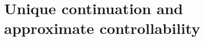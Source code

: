\documentclass[11pt]{article}
\numberwithin{equation}{section}
\def\pt{\partial}
\def\vp{\varphi}
\def\bf{\textbf}
\def\pt{\partial}
\def\om{\omega}
\def\Om{\Omega}
\def\al{\alpha}
\def\ga{\gamma}
\def\ts{\times}
\def\df{\mathrm d}
\begin{document}
		
		
		
		
		
		
		
		
		
		
		\section{Unique continuation and approximate controllability}\label{Se5}
		
\end{document}
